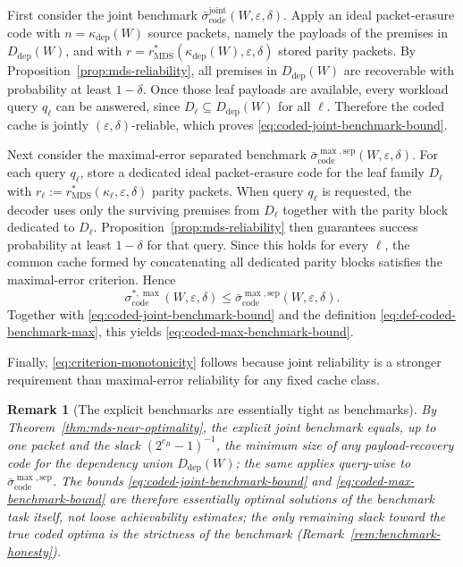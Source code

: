 \documentclass[journal]{IEEEtran}
\makeatletter
\newtheorem{remark}{Remark}[section]
\numberwithin{equation}{section}
\renewenvironment{proof}[1][\proofname]{\par
  \pushQED{\qed}%
  \normalfont \topsep6\p@\@plus6\p@\relax
  \trivlist
  \item[\hskip\labelsep
        \itshape
    #1\@addpunct{.}]\ignorespaces
}{%
  \popQED\endtrivlist\@endpefalse
}
\makeatother
\begin{document}
\begin{proof}
First consider the joint benchmark
\(\bar{\sigma}_{\mathrm{code}}^{\mathrm{joint}}(W,\varepsilon,\delta)\).
Apply an ideal packet-erasure code with \(n=\kappa_{\mathrm{dep}}(W)\)
source packets, namely the payloads of the premises in
\(D_{\mathrm{dep}}(W)\), and with
\(r=r_{\mathrm{MDS}}^*(\kappa_{\mathrm{dep}}(W),\varepsilon,\delta)\)
stored parity packets.  By Proposition~\ref{prop:mds-reliability}, all
premises in \(D_{\mathrm{dep}}(W)\) are recoverable with probability at least
\(1-\delta\).  Once those leaf payloads are available, every workload query
\(q_\ell\) can be answered, since \(D_\ell\subseteq D_{\mathrm{dep}}(W)\) for
all \(\ell\).  Therefore the coded cache is jointly
\((\varepsilon,\delta)\)-reliable, which proves
\eqref{eq:coded-joint-benchmark-bound}.

Next consider the maximal-error separated benchmark
\(\bar{\sigma}_{\mathrm{code}}^{\max,\mathrm{sep}}(W,\varepsilon,\delta)\).
For each query \(q_\ell\), store a dedicated ideal packet-erasure code for
the leaf family \(D_\ell\) with
\(r_\ell:=r_{\mathrm{MDS}}^*(\kappa_\ell,\varepsilon,\delta)\)
parity packets.  When query \(q_\ell\) is requested, the decoder uses only the
surviving premises from \(D_\ell\) together with the parity block dedicated to
\(D_\ell\).  Proposition~\ref{prop:mds-reliability} then guarantees success
probability at least \(1-\delta\) for that query.  Since this holds for every
\(\ell\), the common cache formed by concatenating all dedicated parity blocks
satisfies the maximal-error criterion.  Hence
\[
  \sigma_{\mathrm{code}}^{*,\max}(W,\varepsilon,\delta)
  \le
  \bar{\sigma}_{\mathrm{code}}^{\max,\mathrm{sep}}(W,\varepsilon,\delta).
\]
Together with \eqref{eq:coded-joint-benchmark-bound} and the definition
\eqref{eq:def-coded-benchmark-max}, this yields
\eqref{eq:coded-max-benchmark-bound}.

Finally, \eqref{eq:criterion-monotonicity} follows because joint reliability
is a stronger requirement than maximal-error reliability for any fixed cache
class.
\end{proof}

\begin{remark}[The explicit benchmarks are essentially tight as benchmarks]
\label{rem:benchmark-tightness}
By Theorem~\ref{thm:mds-near-optimality}, the explicit joint benchmark
equals, up to one packet and the slack \((2^{c_B}-1)^{-1}\), the minimum
size of \emph{any} payload-recovery code for the dependency union
\(D_{\mathrm{dep}}(W)\); the same applies query-wise to
\(\bar{\sigma}_{\mathrm{code}}^{\max,\mathrm{sep}}\).  The bounds
\eqref{eq:coded-joint-benchmark-bound} and
\eqref{eq:coded-max-benchmark-bound} are therefore essentially optimal
solutions of the benchmark task itself, not loose achievability estimates;
the only remaining slack toward the true coded optima is the strictness of
the benchmark (Remark~\ref{rem:benchmark-honesty}).
\end{remark}
\end{document}
